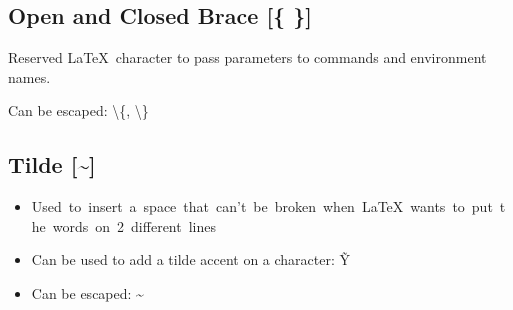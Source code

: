 \documentclass[a4paper]{article}
\begin{document}
	\subsection{Open and Closed Brace [\{ \}]}
	Reserved \LaTeX\ character to pass parameters to commands and environment names.

	Can be escaped: \textbackslash\{, \textbackslash\}

	\subsection{Tilde [\~{}]}
	\begin{itemize}
		\item Used~to~insert~a~space~that~can't~be~broken~when~\LaTeX~wants~to~put~the~words~on~2~different~lines
		\item Can be used to add a tilde accent on a character: \~{Y}
		\item Can be escaped: \~{}
	\end{itemize}
\end{document}

